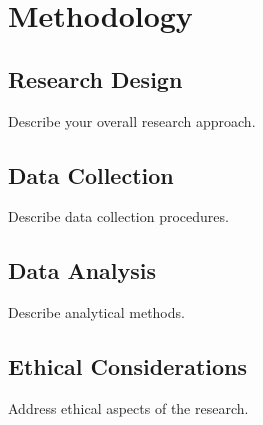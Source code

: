 \chapter{Methodology}
\label{chap:methodology}

\section{Research Design}

Describe your overall research approach.

\section{Data Collection}

Describe data collection procedures.

\section{Data Analysis}

Describe analytical methods.

\section{Ethical Considerations}

Address ethical aspects of the research.
